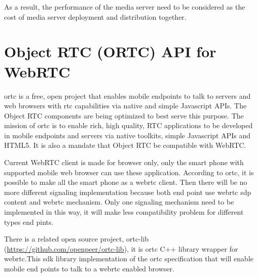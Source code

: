 \par As a result, the performance of the media server need to be considered as the cost of media server deployment and distribution together.

\section{Object RTC (ORTC) API for WebRTC}

\par \gls{ortc} is a free, open project that enables mobile endpoints to talk to servers and web browsers with \gls{rtc} capabilities via native and simple Javascript APIs. The Object RTC components are being optimized to best serve this purpose.\cite{website:ortc} The mission of \gls{ortc} is to enable rich, high quality, RTC applications to be developed in mobile endpoints and servers via native toolkits, simple Javascript APIs and HTML5. It is also a mandate that Object RTC be compatible with WebRTC.

\par Current WebRTC client is made for browser only, only the smart phone with supported mobile web browser can use these application. According to \gls{ortc}, it is possible to make all the smart phone as a \gls{webrtc} client. Then there will be no more different signaling implementation because both end point use \gls{webrtc} \gls{sdp} content and \gls{webrtc} mechanism. Only one signaling mechanism need to be implemented in this way, it will make less compatibility problem for different types end pints.

\par There is a related open source project, ortc-lib (\url{https://github.com/openpeer/ortc-lib}), it is \gls{ortc} C++ library wrapper for \gls{webrtc}.This \gls{sdk} library implementation of the \gls{ortc} specification that will enable mobile end points to talk to a \gls{webrtc} enabled browser.

